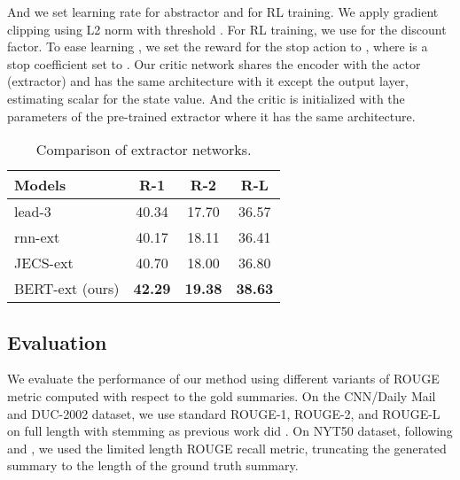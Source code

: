 \documentclass[11pt,a4paper]{article}
\begin{document}
And we set learning rate  for abstractor and  for RL training.
We apply gradient clipping using L2 norm with threshold .
For RL training, we use  for the discount factor.
To ease learning ,
we set the reward for the stop action to ,
where  is a stop coefficient set to .
Our critic network shares the encoder with the actor (extractor)
and has the same architecture with it except the output layer,
estimating scalar for the state value. And the critic is initialized with
the parameters of the pre-trained extractor where it has the same architecture. 

\begin{table}
\begin{center}
\begin{adjustbox}{max width=0.95\columnwidth}
\begin{tabular}{l|ccc}
    \hline 
    \bf Models & \bf R-1 & \bf R-2 & \bf R-L \\ 
    \hline
    lead-3 \cite{see-etal-2017-get} & 40.34 & 17.70 & 36.57 \\
    rnn-ext \cite{chen-bansal-2018-fast} & 40.17 & 18.11 & 36.41 \\
    JECS-ext \cite{xu2019neural} & 40.70 & 18.00 & 36.80 \\ 
    BERT-ext (ours) & \bf 42.29 & \bf 19.38 & \bf 38.63 \\
    \hline
\end{tabular}
\end{adjustbox}
\end{center}
\caption{\label{table:extractor-baseline} Comparison of extractor networks.}
\end{table}

\subsection{Evaluation}

We evaluate the performance of our method using different variants
of ROUGE metric computed with respect to the gold summaries.
On the CNN/Daily Mail and DUC-2002 dataset, we use standard ROUGE-1,
ROUGE-2, and ROUGE-L \cite{lin-2004-rouge} on full length  with stemming
as previous work did \cite{nallapati2017summarunner, see-etal-2017-get, chen-bansal-2018-fast}.
On NYT50 dataset,
following \citet{durrett-etal-2016-learning} and \citet{paulus2018a},
we used the limited length ROUGE recall metric, truncating the generated
summary to the length of the ground truth summary.
\end{document}
